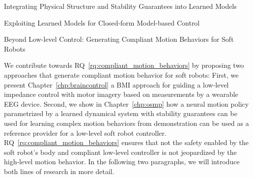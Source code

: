 \begin{contribution}\label{contrib:learned_models}
    Integrating Physical Structure and Stability Guarantees into Learned Models
\end{contribution}

\begin{contribution}\label{contrib:model_based_control_with_learned_models}
    Exploiting Learned Models for Closed-form Model-based Control
\end{contribution}

\begin{contribution}\label{contrib:motion_behaviors}
    Beyond Low-level Control: Generating Compliant Motion Behaviors for Soft Robots
\end{contribution}

We contribute towards \gls{RQ}~\ref{rq:compliant_motion_behaviors} by proposing two approaches that generate compliant motion behavior for soft robots: First, we present Chapter~\ref{chp:braincontrol} a \gls{BMI} approach for guiding a low-level impedance control with motor imagery based on measurements by a wearable \gls{EEG} device. Second, we show in Chapter~\ref{chp:osmp} how a neural motion policy parametrized by a learned dynamical system with stability guarantees can be used for learning complex motion behaviors from demonstration can be used as a reference provider for a low-level soft robot controller. 
\gls{RQ}~\ref{rq:compliant_motion_behaviors} ensures that not the safety enabled by the soft robot's body and compliant low-level controller is not jeopardized by the high-level motion behavior.
In the following two paragraphs, we will introduce both lines of research in more detail.

